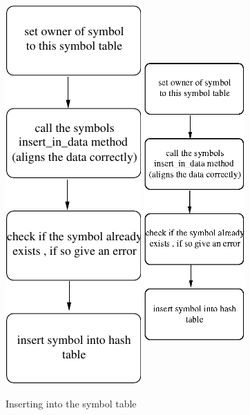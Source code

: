 \documentclass [a4paper,12pt]{article}
\begin{document}
\begin{figure}
\begin{center}
\ifpdf
\includegraphics{arch5.pdf}
\else
\includegraphics[width=1.51in,height=5.51in]{arch5.eps}
\fi
\label{fig5}
\caption{Inserting into the symbol table}
\end{center}
\end{figure}
\end{document}
